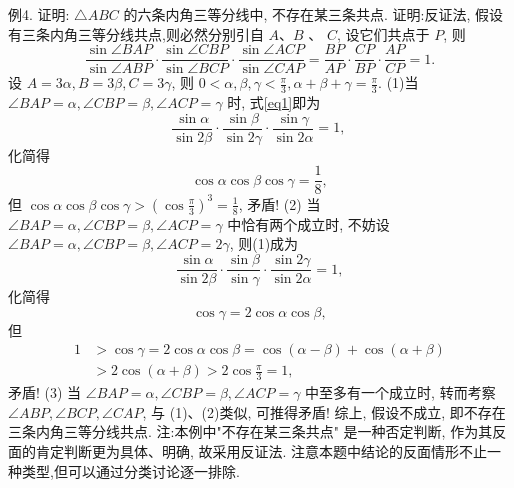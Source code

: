 例4. 证明: $\triangle A B C$ 的六条内角三等分线中, 不存在某三条共点.
证明:反证法, 假设有三条内角三等分线共点,则必然分别引自 $A 、 B$ 、 $C$, 设它们共点于 $P$, 则
$$
\frac{\sin \angle B A P}{\sin \angle A B P} \cdot \frac{\sin \angle C B P}{\sin \angle B C P} \cdot \frac{\sin \angle A C P}{\sin \angle C A P}=\frac{B P}{A P} \cdot \frac{C P}{B P} \cdot \frac{A P}{C P}=1 . \label{eq1}
$$
设 $A=3 \alpha, B=3 \beta, C=3 \gamma$, 则 $0<\alpha, \beta, \gamma<\frac{\pi}{3}, \alpha+\beta+\gamma=\frac{\pi}{3}$.
(1)当 $\angle B A P=\alpha, \angle C B P=\beta, \angle A C P=\gamma$ 时, 式\ref{eq1}即为
$$
\frac{\sin \alpha}{\sin 2 \beta} \cdot \frac{\sin \beta}{\sin 2 \gamma} \cdot \frac{\sin \gamma}{\sin 2 \alpha}=1 \text {, }
$$
化简得
$$
\cos \alpha \cos \beta \cos \gamma=\frac{1}{8},
$$
但 $\cos \alpha \cos \beta \cos \gamma>\left(\cos \frac{\pi}{3}\right)^3=\frac{1}{8}$, 矛盾!
(2) 当 $\angle B A P=\alpha, \angle C B P=\beta, \angle A C P=\gamma$ 中恰有两个成立时, 不妨设 $\angle B A P=\alpha, \angle C B P=\beta, \angle A C P=2 \gamma$, 则(1)成为
$$
\frac{\sin \alpha}{\sin 2 \beta} \cdot \frac{\sin \beta}{\sin \gamma} \cdot \frac{\sin 2 \gamma}{\sin 2 \alpha}=1,
$$
化简得
$$
\cos \gamma=2 \cos \alpha \cos \beta,
$$
但
$$
\begin{aligned}
1 & >\cos \gamma=2 \cos \alpha \cos \beta=\cos (\alpha-\beta)+\cos (\alpha+\beta) \\
& >2 \cos (\alpha+\beta)>2 \cos \frac{\pi}{3}=1,
\end{aligned}
$$
矛盾!
(3) 当 $\angle B A P=\alpha, \angle C B P=\beta, \angle A C P=\gamma$ 中至多有一个成立时, 转而考察 $\angle A B P, \angle B C P, \angle C A P$, 与 (1)、(2)类似, 可推得矛盾!
综上, 假设不成立, 即不存在三条内角三等分线共点.
注:本例中"不存在某三条共点" 是一种否定判断, 作为其反面的肯定判断更为具体、明确, 故采用反证法.
注意本题中结论的反面情形不止一种类型,但可以通过分类讨论逐一排除.



